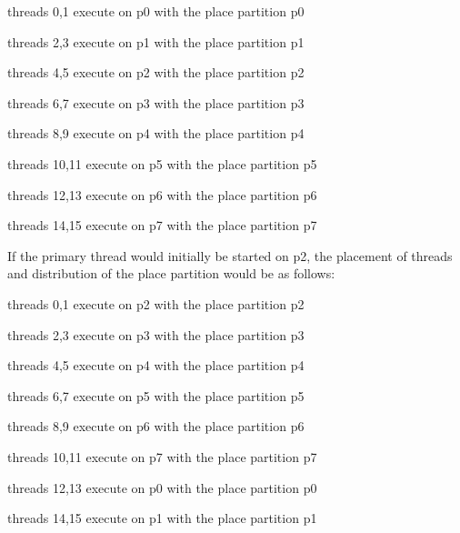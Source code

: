 \begin{compactitem}
\item threads 0,1 execute on p0 with the place partition p0

\item threads 2,3 execute on p1 with the place partition p1

\item threads 4,5 execute on p2 with the place partition p2

\item threads 6,7 execute on p3 with the place partition p3

\item threads 8,9 execute on p4 with the place partition p4

\item threads 10,11 execute on p5 with the place partition p5

\item threads 12,13 execute on p6 with the place partition p6

\item threads 14,15 execute on p7 with the place partition p7
\end{compactitem}

If the primary thread would initially be started on p2, the placement of threads 
and distribution of the place partition would be as follows:

\begin{compactitem}
\item threads 0,1 execute on p2 with the place partition p2

\item threads 2,3 execute on p3 with the place partition p3

\item threads 4,5 execute on p4 with the place partition p4

\item threads 6,7 execute on p5 with the place partition p5

\item threads 8,9 execute on p6 with the place partition p6

\item threads 10,11 execute on p7 with the place partition p7

\item threads 12,13 execute on p0 with the place partition p0

\item threads 14,15 execute on p1 with the place partition p1
\end{compactitem}

